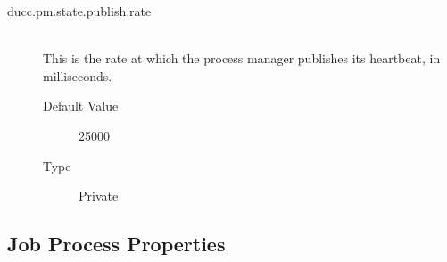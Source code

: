 \begin{description}
      \item[ducc.pm.state.publish.rate] \hfill \\
        This is the rate at which the process manager publishes its heartbeat, in milliseconds. 
        \begin{description}
        \item[Default Value] 25000 
        \item[Type] Private 
        \end{description}
        

      \end{description}
      

\subsection{Job Process Properties}

